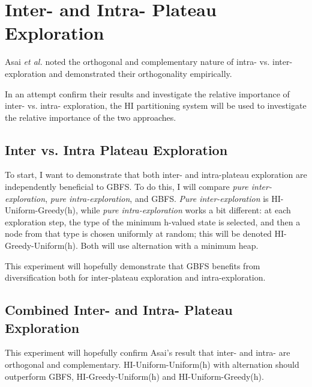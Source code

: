\documentclass{article}
\theoremstyle{definition}
\begin{document}
\section{Inter- and Intra- Plateau Exploration}
Asai \textit{et al.} noted the orthogonal and complementary nature of intra- vs. inter-exploration and demonstrated their orthogonality empirically. 

In an attempt confirm their results and investigate the relative importance of inter- vs. intra- exploration, the HI partitioning system will be used to investigate the relative importance of the two approaches. 

\subsection{Inter vs. Intra Plateau Exploration}
To start, I want to demonstrate that both inter- and intra-plateau exploration are independently beneficial to GBFS. To do this, I will compare \textit{pure inter-exploration}, \textit{pure intra-exploration}, and GBFS. \textit{Pure inter-exploration} is HI-Uniform-Greedy(h), while \textit{pure intra-exploration} works a bit different: at each exploration step, the type of the minimum h-valued state is selected, and then a node from that type is chosen uniformly at random; this will be denoted HI-Greedy-Uniform(h). Both will use alternation with a minimum heap. 

This experiment will hopefully demonstrate that GBFS benefits from diversification both for inter-plateau exploration and intra-exploration. 

\subsection{Combined Inter- and Intra- Plateau Exploration}
This experiment will hopefully confirm Asai's result that inter- and intra- are orthogonal and complementary. HI-Uniform-Uniform(h) with alternation should outperform GBFS, HI-Greedy-Uniform(h) and HI-Uniform-Greedy(h).
\end{document}
